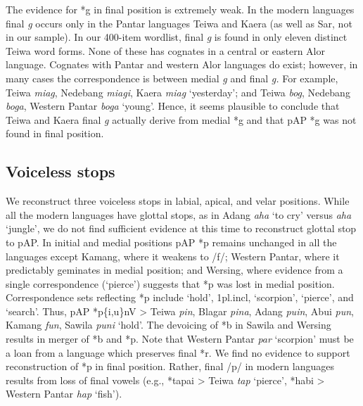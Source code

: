 The evidence for *g in final position is extremely weak. In the modern languages final \textit{g} occurs only in the Pantar languages Teiwa and Kaera (as well as Sar, not in our sample). In our 400-item wordlist, final \textit{g} is found in only eleven distinct Teiwa word forms. None of these has cognates in a central or eastern Alor language. Cognates with Pantar and western Alor languages do exist; however, in many cases the correspondence is between medial \textit{g }and final \textit{g.} For example, Teiwa \textit{mia{\textlengthmark}g}, Nedebang \textit{mia{\textlengthmark}gi}, Kaera \textit{miag} `yesterday'; and Teiwa \textit{bog}, Nedebang \textit{boga}, Western Pantar \textit{bog{\textlengthmark}a} `young'. Hence, it seems plausible to conclude that Teiwa and Kaera final \textit{g} actually derive from medial *g and that pAP *g was not found in final position. 

\subsection{ Voiceless stops}
We reconstruct three voiceless stops in labial, apical, and velar positions. While all the modern languages have glottal stops, as in Adang \textit{{\textglotstop}aha{\textltailn}} `to cry' versus \textit{aha{\textltailn}} `jungle', we do not find sufficient evidence at this time to reconstruct glottal stop to pAP. In initial and medial positions pAP *p remains unchanged in all the languages except Kamang, where it weakens to /f/; Western Pantar, where it predictably geminates in medial position; and Wersing, where evidence from a single correspondence (`pierce') suggests that *p was lost in medial position. Correspondence sets reflecting *p include `hold', 1pl.incl, `scorpion', `pierce', and `search'. Thus, pAP *p\{i,u\}nV {\textgreater} Teiwa \textit{pin}, Blagar \textit{pina}, Adang \textit{puin}, Abui \textit{pun}, Kamang \textit{fun}, Sawila \textit{puni }`hold'. The devoicing of *b in Sawila and Wersing results in merger of *b and *p.  Note that Western Pantar \textit{par} `scorpion' must be a loan from a 
language which preserves final *r. We find no evidence to support reconstruction of *p in final position. Rather, final /p/ in modern languages results from loss of final vowels (e.g., *tapai {\textgreater} Teiwa \textit{tap }`pierce', *habi {\textgreater} Western Pantar \textit{hap }`fish'). 

